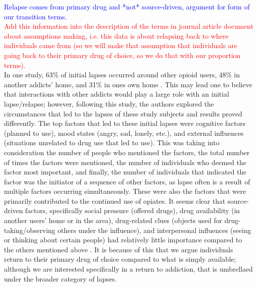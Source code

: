 \documentclass[12pt]{article}
\begin{document}


\textcolor{blue}{Relapse comes from primary drug and *not* source-driven, argument for form of our transition terms.} \\
\textcolor{red}{Add this information into the description of the terms in journal article document about assumptions making, i.e. this data is about relapsing back to where individuals came from (so we will make that assumption that individuals are going back to their primary drug of choice, so we do that with our proportion terms).} \\
In one study, 63\% of initial lapses occurred around other opioid users, 48\% in another addicts' home, and 31\% in ones own home \cite{Gossop1}. This may lead one to believe that interactions with other addicts would play a large role with an initial lapse/relapse; however, following this study, the authors explored the circumstances that led to the lapses of these study subjects and results proved differently. The top factors that led to these initial lapses were cognitive factors (planned to use), mood states (angry, sad, lonely, etc.), and external influences (situations unrelated to drug use that led to use). This was taking into consideration the number of people who mentioned the factors, the total number of times the factors were mentioned, the number of individuals who deemed the factor most important, and finally, the number of individuals that indicated the factor was the initiator of a sequence of other factors, as lapse often is a result of multiple factors occurring simultaneously. These were also the factors that were primarily contributed to the continued use of opiates. It seems clear that source-driven factors, specifically social pressure (offered drugs), drug availability (in another users' home or in the area), drug-related clues (objects used for drug-taking/observing others under the influence), and interpersonal influences (seeing or thinking about certain people) had relatively little importance compared to the others mentioned above \cite{Gossop2}. It is because of this that we argue individuals return to their primary drug of choice compared to what is simply available; although we are interested specifically in a return to addiction, that is umbrellaed under the broader category of lapses. \\
\end{document}
